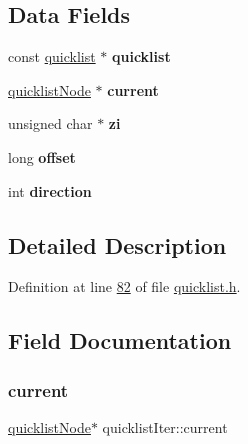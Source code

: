 \subsection*{Data Fields}
\begin{DoxyCompactItemize}
\item 
\mbox{\label{structquicklistIter_a96f3cb9620d02fd35ce23c3e1dc78fe6}} 
const \hyperlink{structquicklist}{quicklist} $\ast$ {\bfseries quicklist}
\item 
\mbox{\label{structquicklistIter_aae153f37f4311948cefc388108bcad09}} 
\hyperlink{structquicklistNode}{quicklist\+Node} $\ast$ {\bfseries current}
\item 
\mbox{\label{structquicklistIter_a39666e7cf1a235782c450a312f24fa53}} 
unsigned char $\ast$ {\bfseries zi}
\item 
\mbox{\label{structquicklistIter_ac9cddc582b7ef36c9a6973af2613346a}} 
long {\bfseries offset}
\item 
\mbox{\label{structquicklistIter_ab4f85637054a1824e3bcff6ea7165c61}} 
int {\bfseries direction}
\end{DoxyCompactItemize}


\subsection{Detailed Description}


Definition at line \hyperlink{quicklist_8h_source_l00082}{82} of file \hyperlink{quicklist_8h_source}{quicklist.\+h}.



\subsection{Field Documentation}
\mbox{\label{structquicklistIter_aae153f37f4311948cefc388108bcad09}} 
\subsubsection{\texorpdfstring{current}{current}}
{\footnotesize\ttfamily \hyperlink{structquicklistNode}{quicklist\+Node}$\ast$ quicklist\+Iter\+::current}



